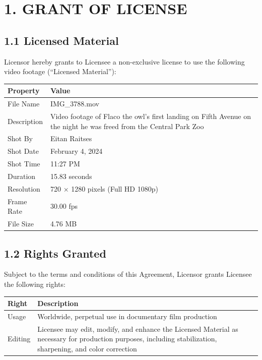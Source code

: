 \documentclass[
  11pt,
]{article}
\begin{document}
\hypertarget{grant-of-license}{%
\section{1. GRANT OF LICENSE}\label{grant-of-license}}

\hypertarget{licensed-material}{%
\subsection{1.1 Licensed Material}\label{licensed-material}}

Licensor hereby grants to Licensee a non-exclusive license to use the
following video footage (``Licensed Material''):

\begin{table}[h]
\centering
\begin{tabular}{L{3.5cm}L{10.5cm}}
\toprule
\textbf{Property} & \textbf{Value} \\
\midrule
File Name & IMG\_3788.mov \\
Description & Video footage of Flaco the owl's first landing on Fifth Avenue on the night he was freed from the Central Park Zoo \\
Shot By & Eitan Raitses \\
Shot Date & February 4, 2024 \\
Shot Time & 11:27 PM \\
Duration & 15.83 seconds \\
Resolution & 720 × 1280 pixels (Full HD 1080p) \\
Frame Rate & 30.00 fps \\
File Size & 4.76 MB \\
\bottomrule
\end{tabular}
\end{table}

\hypertarget{rights-granted}{%
\subsection{1.2 Rights Granted}\label{rights-granted}}

Subject to the terms and conditions of this Agreement, Licensor grants
Licensee the following rights:

\begin{table}[h]
\centering
\begin{tabular}{L{3.5cm}L{10.5cm}}
\toprule
\textbf{Right} & \textbf{Description} \\
\midrule
Usage & Worldwide, perpetual use in documentary film production \\
Editing & Licensee may edit, modify, and enhance the Licensed Material as necessary for production purposes, including stabilization, sharpening, and color correction \\
\bottomrule
\end{tabular}
\end{table}
\end{document}
